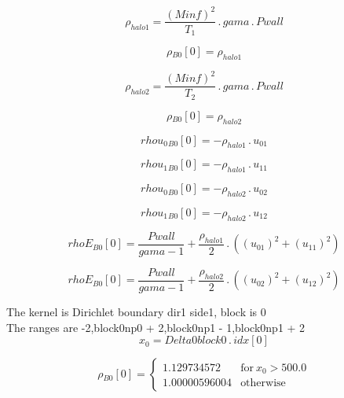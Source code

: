 \documentclass{article}
\begin{document}
\begin{dmath}\rho_{halo 1} = \frac{\left(Minf \right)^{2}}{T_{1}} \,.\, gama \,.\, Pwall\end{dmath}

\begin{dmath}{\rho{_{B0}}}[{0}] = \rho_{halo 1}\end{dmath}

\begin{dmath}\rho_{halo 2} = \frac{\left(Minf \right)^{2}}{T_{2}} \,.\, gama \,.\, Pwall\end{dmath}

\begin{dmath}{\rho{_{B0}}}[{0}] = \rho_{halo 2}\end{dmath}

\begin{dmath}{rhou_{0}{_{B0}}}[{0}] = - \rho_{halo 1} \,.\, u_{01}\end{dmath}

\begin{dmath}{rhou_{1}{_{B0}}}[{0}] = - \rho_{halo 1} \,.\, u_{11}\end{dmath}

\begin{dmath}{rhou_{0}{_{B0}}}[{0}] = - \rho_{halo 2} \,.\, u_{02}\end{dmath}

\begin{dmath}{rhou_{1}{_{B0}}}[{0}] = - \rho_{halo 2} \,.\, u_{12}\end{dmath}

\begin{dmath}{rhoE{_{B0}}}[{0}] = \frac{Pwall}{gama - 1} + \frac{\rho_{halo 1}}{2} \,.\, \left(\left(u_{01} \right)^{2} + \left(u_{11} \right)^{2}\right)\end{dmath}

\begin{dmath}{rhoE{_{B0}}}[{0}] = \frac{Pwall}{gama - 1} + \frac{\rho_{halo 2}}{2} \,.\, \left(\left(u_{02} \right)^{2} + \left(u_{12} \right)^{2}\right)\end{dmath}

\noindent The kernel is Dirichlet boundary dir1 side1, block is 0\\\noindent The ranges are -2,block0np0 + 2,block0np1 - 1,block0np1 + 2\\\begin{dmath}x_{0} = Delta0block0 \,.\, {idx}[{0}]\end{dmath}

\begin{dmath}{\rho{_{B0}}}[{0}] = \begin{cases} 1.129734572 & \text{for}\: x_{0} > 500.0 \\1.00000596004 & \text{otherwise} \end{cases}\end{dmath}
\end{document}
